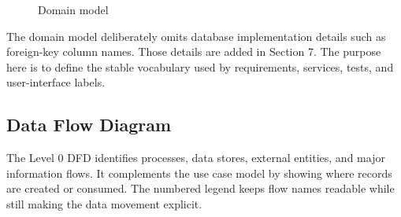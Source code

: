 \documentclass[11pt,a4paper]{article}
\begin{document}
\begin{figure}[H]
{%
}
\caption{Domain model}
\end{figure}

The domain model deliberately omits database implementation details such as foreign-key column names. Those details are added in Section 7. The purpose here is to define the stable vocabulary used by requirements, services, tests, and user-interface labels.

\subsection{Data Flow Diagram}
The Level 0 DFD identifies processes, data stores, external entities, and major information flows. It complements the use case model by showing where records are created or consumed. The numbered legend keeps flow names readable while still making the data movement explicit.
\end{document}
